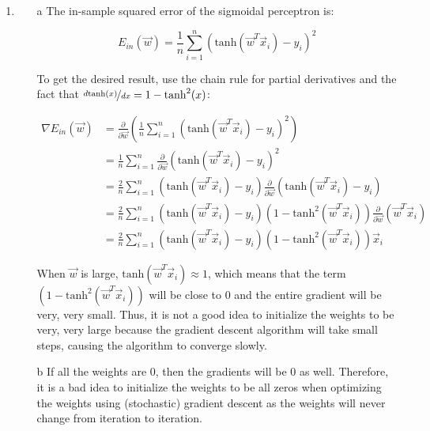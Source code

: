 \documentclass[10pt]{article}
\begin{document}
\begin{enumerate}
\item 

\begin{itemize}
    \item[a]
The in-sample squared error of the sigmoidal perceptron is:
	
		  \begin{equation}
		  	E_{in}(\vec{w})=\frac{1}{n}\sum_{i=1}^n(\textrm{tanh}(\vec{w}^T\vec{x}_i)-y_i)^2 \nonumber
		  \end{equation}
		  
		  To get the desired result, use the chain rule for partial derivatives and 
		  the fact that $\nicefrac{d\textrm{tanh}(x)}{dx}=1-\textrm{tanh}^2(x)$:
		  
		  \begin{align}
		  	\nabla E_{in}(\vec{w})&=\frac{\partial}{\partial\vec{w}}\left(\frac{1}{n}\sum_{i=1}^n(\textrm{tanh}(\vec{w}^T\vec{x}_i)-y_i)^2\right) \nonumber \\
		  						  &=\frac{1}{n}\sum_{i=1}^n\frac{\partial}{\partial\vec{w}}(\textrm{tanh}(\vec{w}^T\vec{x}_i)-y_i)^2 \nonumber \\
		  						  &=\frac{2}{n}\sum_{i=1}^n(\textrm{tanh}(\vec{w}^T\vec{x}_i)-y_i)\frac{\partial}{\partial\vec{w}}(\textrm{tanh}(\vec{w}^T\vec{x}_i)-y_i) \nonumber \\
		  						  &=\frac{2}{n}\sum_{i=1}^n(\textrm{tanh}(\vec{w}^T\vec{x}_i)-y_i)(1-\textrm{tanh}^2(\vec{w}^T\vec{x}_i))\frac{\partial}{\partial\vec{w}}(\vec{w}^T\vec{x}_i) \nonumber \\
		  						  &=\frac{2}{n}\sum_{i=1}^n(\textrm{tanh}(\vec{w}^T\vec{x}_i)-y_i)(1-\textrm{tanh}^2(\vec{w}^T\vec{x}_i))\vec{x}_i \nonumber
		  \end{align}
	      
	      When $\vec{w}$ is large, $\textrm{tanh}(\vec{w}^T\vec{x}_i)\approx 1$, which 
	      means that the term $(1-\textrm{tanh}^2(\vec{w}^T\vec{x}_i))$ will be close 
	      to $0$ and the entire gradient will be very, very small. Thus, it is not a good
	      idea to initialize the weights to be very, very large because the gradient 
	      descent algorithm will take small steps, causing the algorithm to converge slowly. 
    \item[b]
    If all the weights are $0$, then the gradients will be $0$ as well.
Therefore, it is a bad idea to initialize the weights to be all zeros when
optimizing the weights using (stochastic) gradient descent as the weights will
never change from iteration to iteration.


\end{itemize}
\end{enumerate}
\end{document}
